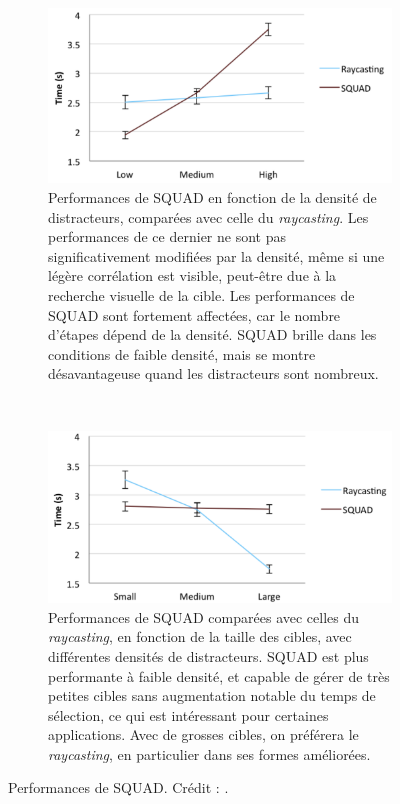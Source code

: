 	\begin{figure}[!htb]
		\begin{subfigure}[t]{0.49\textwidth}
			\centering
			\includegraphics[width=\textwidth]{figures/ch2/squadDensity}
			\caption{Performances de SQUAD en fonction de la densité de distracteurs, comparées avec celle du \emph{raycasting}. Les performances de ce dernier ne sont pas significativement modifiées par la densité, même si une légère corrélation est visible, peut-être due à la recherche visuelle de la cible. Les performances de SQUAD sont fortement affectées, car le nombre d'étapes dépend de la densité. SQUAD brille dans les conditions de faible densité, mais se montre désavantageuse quand les distracteurs sont nombreux.}
			\label{fig:squadDensity}
		\end{subfigure}
		~
		\begin{subfigure}[t]{0.49\textwidth}
			\centering
			\includegraphics[width=\textwidth]{figures/ch2/squadSize}
			\caption{Performances de SQUAD comparées avec celles du \emph{raycasting}, en fonction de la taille des cibles, avec différentes densités de distracteurs. SQUAD est plus performante à faible densité, et capable de gérer de très petites cibles sans augmentation notable du temps de sélection, ce qui est intéressant pour certaines applications. Avec de grosses cibles, on préférera le \emph{raycasting}, en particulier dans ses formes améliorées.}
			\label{fig:squadSize}
		\end{subfigure}
		\caption[Performances de SQUAD]{Performances de SQUAD. Crédit : \cite{kopper2011rapid}.}
		\label{fig:squadPerf}
	\end{figure}
	
